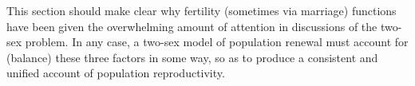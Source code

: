 This section should make clear why fertility (sometimes via marriage) functions
have been given the overwhelming amount of attention in discussions of the two-sex
problem. In any case, a two-sex model of population renewal must account
for (balance) these three factors in some way, so as to produce a consistent
and unified account of population reproductivity.

 \FloatBarrier